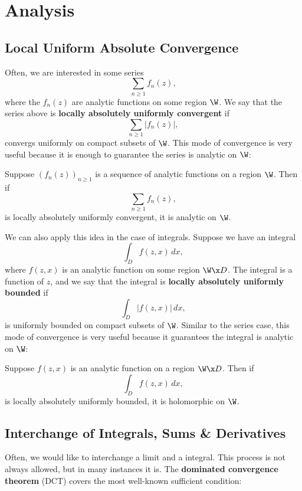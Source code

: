 \chapter{Analysis}
  \section{Local Uniform Absolute Convergence}
    Often, we are interested in some series
    \[
      \sum_{n \ge 1}f_{n}(z),
    \]
    where the $f_{n}(z)$ are analytic functions on some region $\W$. We say that the series above is \textbf{locally absolutely uniformly convergent} if
    \[
      \sum_{n \ge 1}|f_{n}(z)|,
    \]
    convergs uniformly on compact subsets of $\W$. This mode of convergence is very useful because it is enough to guarantee the series is analytic on $\W$:

    \begin{theorem}
      Suppose $(f_{n}(z))_{n \ge 1}$ is a sequence of analytic functions on a region $\W$. Then if
      \[
        \sum_{n \ge 1}f_{n}(z),
      \]
      is locally absolutely uniformly convergent, it is analytic on $\W$.
    \end{theorem}

    We can also apply this idea in the case of integrals. Suppose we have an integral
    \[
      \int_{D}f(z,x)\,dx,
    \]
    where $f(z,x)$ is an analytic function on some region $\W \x D$. The integral is a function of $z$, and we say that the integral is \textbf{locally absolutely uniformly bounded} if
    \[
      \int_{D}|f(z,x)|\,dx,
    \]
    is uniformly bounded on compact subsets of $\W$. Similar to the series case, this mode of convergence is very useful because it guarantees the integral is analytic on $\W$:

    \begin{theorem}\label{thm:analytic_integral}
      Suppose $f(z,x)$ is an analytic function on a region $\W \x D$. Then if
      \[
        \int_{D}f(z,x)\,dx,
      \]
      is locally absolutely uniformly bounded, it is holomorphic on $\W$.
    \end{theorem}
  \section{Interchange of Integrals, Sums \& Derivatives}
    Often, we would like to interchange a limit and a integral. This process is not always allowed, but in many instances it is. The \textbf{dominated convergence theorem} (DCT) covers the most well-known sufficient condition:

